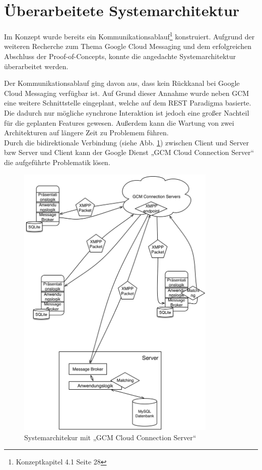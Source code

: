 
\section{Überarbeitete Systemarchitektur}

Im Konzept wurde bereits ein Kommunikationsablauf\footnote{Konzeptkapitel 4.1 Seite 28} konstruiert. Aufgrund der weiteren Recherche zum Thema Google Cloud Messaging und dem erfolgreichen Abschluss der Proof-of-Concepts, konnte die angedachte Systemarchitektur überarbeitet werden.

Der Kommunikationsablauf ging davon aus, dass kein Rückkanal bei Google Cloud Messaging verfügbar ist. Auf Grund dieser Annahme wurde neben GCM eine weitere Schnittstelle eingeplant, welche auf dem REST Paradigma basierte. Die dadurch nur mögliche synchrone Interaktion ist jedoch eine großer Nachteil für die geplanten Features gewesen. Außerdem kann die Wartung von zwei Architekturen auf längere Zeit zu Problemem führen.\\

Durch die bidirektionale Verbindung (siehe Abb. \ref{fg:gcmccsarchitecture}) zwischen Client und Server bzw Server und Client kann der Google Dienst „GCM Cloud Connection Server“ die aufgeführte Problematik lösen.

\begin{figure}[H]
	\centering
	\includegraphics[width=0.85\textwidth]{./images/architekturneu.png}
	\caption{Systemarchitekur mit „GCM Cloud Connection Server“}
	\label{fg:gcmccsarchitecture}
\end{figure}
